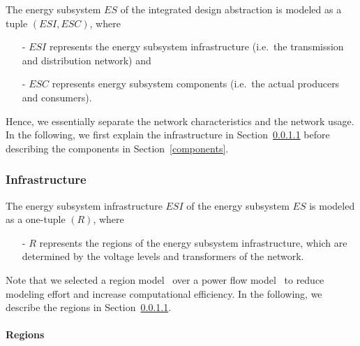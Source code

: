 The energy subsystem $ES$ of the integrated design abstraction is modeled as a tuple $(ESI, ESC)$, where
\begin{itemize}
	\item[-] $ESI$ represents the energy subsystem infrastructure (i.e.\ the transmission and distribution network) and
	\item[-] $ESC$ represents energy subsystem components (i.e.\ the actual producers and consumers).
\end{itemize}
Hence, we essentially separate the network characteristics and the network usage. In the following, we first explain the infrastructure in Section~\ref{regions} before describing the components in Section~\ref{components}.

\subsubsection{Infrastructure}
\label{energy_infrastructure}

The energy subsystem infrastructure $ESI$ of the energy subsystem $ES$ is modeled as a one-tuple $(R)$, where
\begin{itemize}
	\item[-] $R$ represents the regions of the energy subsystem infrastructure, which are determined by the voltage levels and transformers of the network.
\end{itemize}
Note that we selected a region model~\cite{Hackenberg2012} over a power flow model~\cite{Dommel1968} to reduce modeling effort and increase computational efficiency. In the following, we describe the regions in Section~\ref{regions}.

\paragraph{Regions}
\label{regions}

